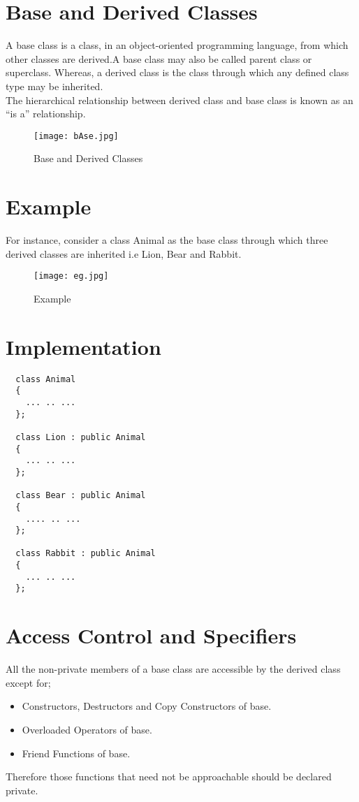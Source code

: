 \documentclass[11pt,fleqn]{book} %
\begin{document}
\section{Base and Derived Classes}

A base class is a class, in an object-oriented programming language, from which other classes are derived.A base class may also be called parent class or superclass. Whereas, a derived class is the class through which any defined class type may be inherited.\\
The hierarchical relationship between derived class and base class is known as an “is a” relationship.
\begin{figure}[h]
  \centering\texttt{[image: bAse.jpg]}
  \caption{Base and Derived Classes}
\end{figure}

\newpage
\section{Example}

For instance, consider a class Animal as the base class through which three derived classes are inherited i.e Lion, Bear and Rabbit.

\begin{figure}[h]
  \centering\texttt{[image: eg.jpg]}
  \caption{Example}
\end{figure}
\hfill

\newpage
\section{Implementation}
\begin{lstlisting}
  class Animal 
  {
    ... .. ...
  };

  class Lion : public Animal
  {
    ... .. ...
  };

  class Bear : public Animal
  {
    .... .. ...
  };

  class Rabbit : public Animal 
  {
    ... .. ...
  };
\end{lstlisting}
\hfill 
\section{Access Control and Specifiers}
All the non-private members of a base class are accessible by the derived class except for;

\begin{itemize}
\item Constructors, Destructors and Copy Constructors of base.
\item Overloaded Operators of base.
\item Friend Functions of base.
\end{itemize}
Therefore those functions that need not be approachable should be declared private.
\end{document}
